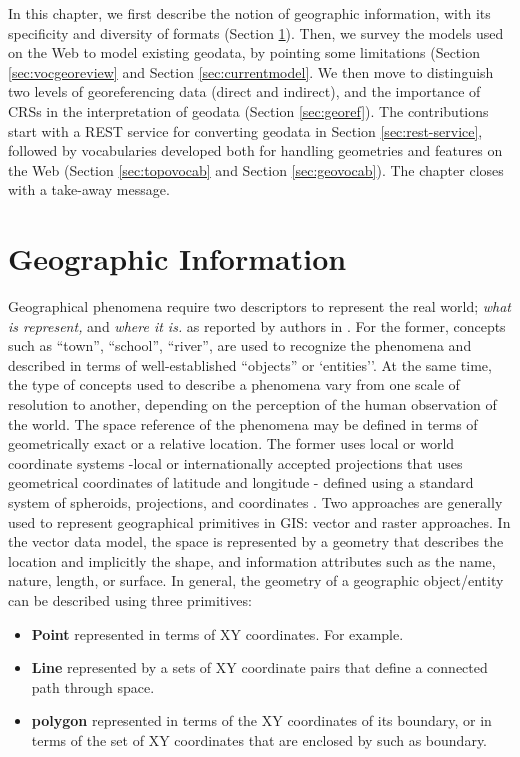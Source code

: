 In this chapter, we first describe the notion of geographic information, with its specificity and diversity of formats (Section \ref{sec:geointro}). Then, we survey the models used on the Web to model existing geodata, by pointing some limitations (Section \ref{sec:vocgeoreview} and Section \ref{sec:currentmodel}. We then move to distinguish two levels of georeferencing data (direct and indirect), and the importance of CRSs in the interpretation of geodata (Section \ref{sec:georef}). The contributions start with a REST service for converting geodata in Section \ref{sec:rest-service}, followed by vocabularies developed both for handling geometries and features on the Web (Section \ref{sec:topovocab} and Section \ref{sec:geovocab}). The chapter closes with a take-away message.



\section{Geographic Information}
\label{sec:geointro}

Geographical phenomena require two descriptors to represent the real world; \textit{what is represent,} and \textit{where it is.} as reported by authors in \cite{burrough98}. For the former, concepts such as ``town'', ``school'', ``river'', are used to recognize the phenomena and described in terms of well-established ``objects'' or `entities''. At the same time, the type of concepts used to describe a phenomena vary from one scale of resolution to another, depending on the perception of the human observation of the world. The space reference of the phenomena may be defined in terms of geometrically exact or a relative location. The former uses local or world coordinate systems -local or internationally accepted projections that uses geometrical coordinates of latitude and longitude - defined using a standard system of spheroids, projections, and coordinates \cite{burrough98}. Two approaches are generally used to represent geographical primitives in GIS: vector and raster approaches. In the vector data model, the space is represented by a geometry that describes the location and implicitly the shape, and information attributes such as the name, nature, length, or surface. In general, the geometry of a geographic object/entity can be described using three primitives:
\begin{itemize}
\item \textbf{Point} represented in terms of XY coordinates. For example. 
\item \textbf{Line} represented by a sets of XY coordinate pairs that define a connected path through space. 
\item \textbf{polygon} represented in terms of the XY coordinates of its boundary, or in terms of the set of XY coordinates that are enclosed by such as boundary. 
\end{itemize}    

